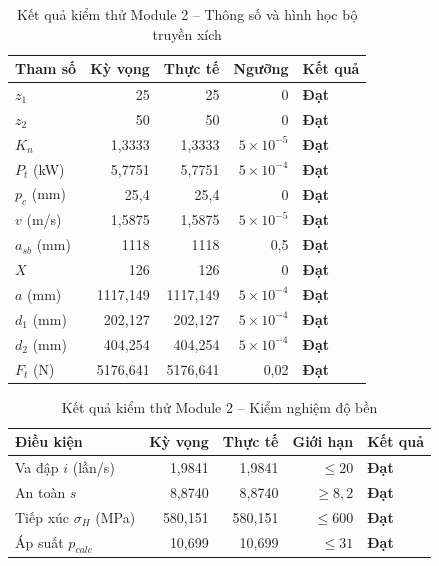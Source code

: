 \begin{table}[H]
  \centering
  \caption{Kết quả kiểm thử Module 2 -- Thông số và hình học bộ truyền xích}
  \label{tab:test-m2}
  \begin{tabular}{lrrrl}
    \toprule
    \textbf{Tham số} & \textbf{Kỳ vọng} & \textbf{Thực tế} & \textbf{Ngưỡng} & \textbf{Kết quả} \\
    \midrule
    $z_1$ & 25 & 25 & 0 & \textbf{Đạt} \\
    $z_2$ & 50 & 50 & 0 & \textbf{Đạt} \\
    $K_n$ & 1,3333 & 1,3333 & $5\times10^{-5}$ & \textbf{Đạt} \\
    $P_t$ (kW) & 5,7751 & 5,7751 & $5\times10^{-4}$ & \textbf{Đạt} \\
    $p_c$ (mm) & 25,4 & 25,4 & 0 & \textbf{Đạt} \\
    $v$ (m/s) & 1,5875 & 1,5875 & $5\times10^{-5}$ & \textbf{Đạt} \\
    $a_{sb}$ (mm) & 1118 & 1118 & 0,5 & \textbf{Đạt} \\
    $X$ & 126 & 126 & 0 & \textbf{Đạt} \\
    $a$ (mm) & 1117,149 & 1117,149 & $5\times10^{-4}$ & \textbf{Đạt} \\
    $d_1$ (mm) & 202,127 & 202,127 & $5\times10^{-4}$ & \textbf{Đạt} \\
    $d_2$ (mm) & 404,254 & 404,254 & $5\times10^{-4}$ & \textbf{Đạt} \\
    $F_t$ (N) & 5176,641 & 5176,641 & 0,02 & \textbf{Đạt} \\
    \bottomrule
  \end{tabular}
\end{table}

\begin{table}[H]
  \centering
  \caption{Kết quả kiểm thử Module 2 -- Kiểm nghiệm độ bền}
  \label{tab:test-m2-validation}
  \begin{tabular}{lrrrl}
    \toprule
    \textbf{Điều kiện} & \textbf{Kỳ vọng} & \textbf{Thực tế} & \textbf{Giới hạn} & \textbf{Kết quả} \\
    \midrule
    Va đập $i$ (lần/s) & 1,9841 & 1,9841 & $\leq 20$ & \textbf{Đạt} \\
    An toàn $s$ & 8,8740 & 8,8740 & $\geq 8{,}2$ & \textbf{Đạt} \\
    Tiếp xúc $\sigma_H$ (MPa) & 580,151 & 580,151 & $\leq 600$ & \textbf{Đạt} \\
    Áp suất $p_{calc}$ & 10,699 & 10,699 & $\leq 31$ & \textbf{Đạt} \\
    \bottomrule
  \end{tabular}
\end{table}

